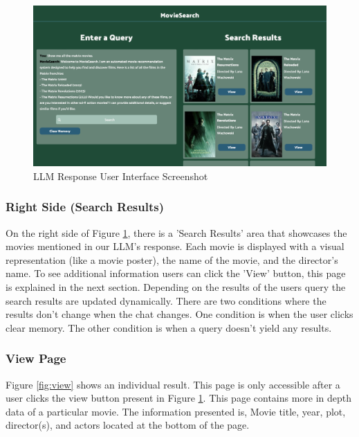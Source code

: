 \documentclass[journal]{IEEEtran}
\theoremstyle{mydefstyle}
\begin{document}
\begin{figure}
    \centering
    \includegraphics[width=1\linewidth]{doc//report//assets/Results.png}
    \caption{LLM Response User Interface Screenshot}
    \label{fig:results}
\end{figure}

\subsubsection{Right Side (Search Results)}
On the right side of Figure \ref{fig:results}, there is a 'Search Results' area that showcases the movies mentioned in our LLM's response. Each movie is displayed with a visual representation (like a movie poster), the name of the movie, and the director's name. To see additional information users can click the 'View' button, this page is explained in the next section. Depending on the results of the users query the search results are updated dynamically. There are two conditions where the results don't change when the chat changes. One condition is when the user clicks clear memory. The other condition is when a query doesn't yield any results.

\subsubsection{View Page}
Figure \ref{fig:view} shows an individual result. This page is only accessible after a user clicks the view button present in Figure \ref{fig:results}. This page contains more in depth data of a particular movie. The information presented is, Movie title, year, plot, director(s), and actors located at the bottom of the page.
\end{document}
